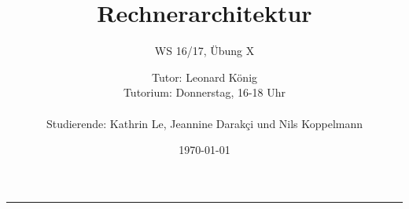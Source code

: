 \documentclass[
	11pt,								%
	parskip=half-,						%
	paper=a4,							%
	english,ngerman,					%
	]{scrartcl}							%
\begin{document}
\begin{titlepage}
	\subject{Jochen Schiller}					%
	\title{Rechnerarchitektur}	%
	\subtitle{\Large WS 16/17, Übung X}	%
	\author{%
    	Tutor: Leonard König\\			%
        Tutorium: Donnerstag, 16-18 Uhr\\ \\	%
        Studierende: Kathrin Le, Jeannine Darakçi und Nils Koppelmann}		%
	\date{\normalsize \today}					%
\end{titlepage}

\maketitle								%
\vspace*{-11cm}							%

\vspace{8.2cm}							%
\rule{\linewidth}{0.8pt}				%

\section*{}

\end{document}

